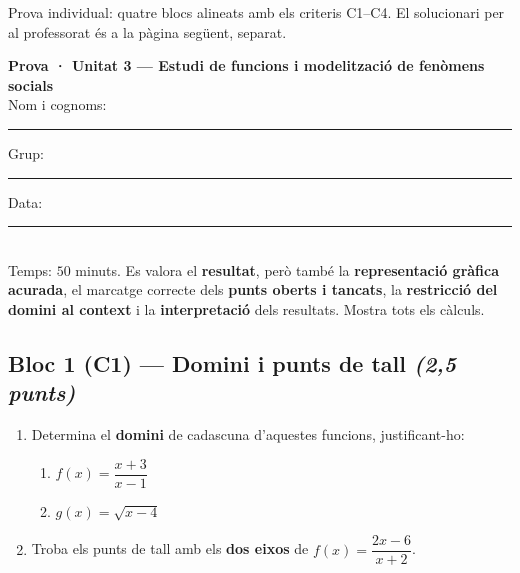 %
{Prova individual: quatre blocs alineats amb els criteris C1–C4. El solucionari per al professorat és a la pàgina següent, separat.}

\begin{tcolorbox}[colback=white, colframe=udnavy, boxrule=0.8pt, arc=2pt,
  left=8pt, right=8pt, top=6pt, bottom=6pt]
\textbf{Prova · Unitat 3 — Estudi de funcions i modelització de fenòmens socials}\\[4pt]
Nom i cognoms: \rule{6.5cm}{0.4pt} \quad Grup: \rule{1.6cm}{0.4pt} \quad Data: \rule{2.2cm}{0.4pt}\\[6pt]
\small Temps: $50$ minuts. Es valora el \textbf{resultat}, però també la
\textbf{representació gràfica acurada}, el marcatge correcte dels \textbf{punts
oberts i tancats}, la \textbf{restricció del domini al context} i la
\textbf{interpretació} dels resultats. Mostra tots els càlculs.
\end{tcolorbox}

\vspace{0.4em}

\subsection*{Bloc 1 (C1) — Domini i punts de tall \hfill \normalfont\itshape (2,5 punts)}

\begin{enumerate}[label=\textbf{\arabic*.}, leftmargin=2em, itemsep=8pt]
  \item Determina el \textbf{domini} de cadascuna d'aquestes funcions, justificant-ho:
    \begin{enumerate}[label=\alph*), leftmargin=1.6em, topsep=2pt]
      \item $f(x)=\dfrac{x+3}{x-1}$ \hfill \item $g(x)=\sqrt{x-4}$
    \end{enumerate}
  \item Troba els punts de tall amb els \textbf{dos eixos} de $f(x)=\dfrac{2x-6}{x+2}$.
\end{enumerate}

